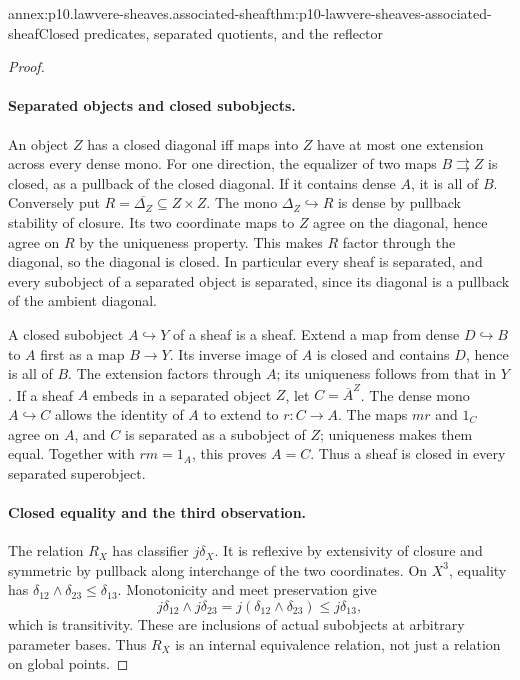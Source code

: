 \begin{annexitem}{annex:p10.lawvere-sheaves.associated-sheaf}{thm:p10-lawvere-sheaves-associated-sheaf}{Closed predicates, separated quotients, and the reflector}
\begin{proof}
\paragraph{Separated objects and closed subobjects.}
An object \(Z\) has a closed diagonal iff maps into
\(Z\) have at most one extension across every dense
mono.  For one direction, the equalizer of two maps
\(B\rightrightarrows Z\) is closed, as a pullback
of the closed diagonal.  If it contains dense \(A\),
it is all of \(B\).  Conversely put
\(R=\overline{\Delta_Z}\subseteq Z\times Z\).
The mono \(\Delta_Z\hookrightarrow R\) is dense by
pullback stability of closure.  Its two coordinate maps
to \(Z\) agree on the diagonal, hence agree on \(R\)
by the uniqueness property.  This makes \(R\) factor
through the diagonal, so the diagonal is closed.
In particular every sheaf is separated, and every subobject
of a separated object is separated, since its diagonal is
a pullback of the ambient diagonal.

A closed subobject \(A\hookrightarrow Y\) of a sheaf
is a sheaf.  Extend a map from dense \(D\hookrightarrow B\)
to \(A\) first as a map \(B\to Y\).  Its inverse
image of \(A\) is closed and contains \(D\), hence
is all of \(B\).  The extension factors through \(A\);
its uniqueness follows from that in \(Y\).
If a sheaf \(A\) embeds in a separated object \(Z\),
let \(C=\overline A^{Z}\).  The dense mono
\(A\hookrightarrow C\) allows the identity of \(A\)
to extend to \(r:C\to A\).  The maps \(mr\) and
\(1_C\) agree on \(A\), and \(C\) is separated
as a subobject of \(Z\); uniqueness makes them equal.
Together with \(rm=1_A\), this proves \(A=C\).
Thus a sheaf is closed in every separated superobject.

\paragraph{Closed equality and the third observation.}
The relation \(R_X\) has classifier \(j\delta_X\).
It is reflexive by extensivity of closure and symmetric
by pullback along interchange of the two coordinates.
On \(X^3\), equality has
\(\delta_{12}\land\delta_{23}\leq\delta_{13}\).
Monotonicity and meet preservation give
\[
 j\delta_{12}\land j\delta_{23}
     =j(\delta_{12}\land\delta_{23})\leq j\delta_{13},
\]
which is transitivity.  These are inclusions of actual
subobjects at arbitrary parameter bases.  Thus \(R_X\)
is an internal equivalence relation, not just a relation
on global points.


\end{proof}
\end{annexitem}
